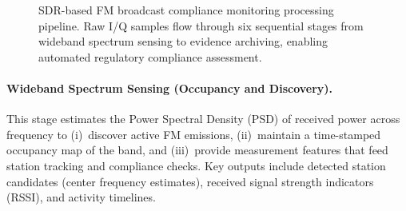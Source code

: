 \documentclass[11pt]{report}
\begin{document}
\begin{description}
\begin{figure}[!ht]
	\caption{SDR-based FM broadcast compliance monitoring processing pipeline. Raw I/Q samples flow through six sequential stages from wideband spectrum sensing to evidence archiving, enabling automated regulatory compliance assessment.}
	\label{fig:processing_pipeline}
\end{figure}

\end{description}
\paragraph*{Wideband Spectrum Sensing (Occupancy and Discovery).}
This stage estimates the Power Spectral Density (PSD) of received power across frequency to  (i)~discover active FM emissions, (ii)~maintain a time-stamped occupancy map  of the band, and (iii)~provide measurement features that feed station  tracking and compliance checks. Key outputs include detected station candidates (center frequency estimates), received signal strength indicators (RSSI), and activity timelines.
\end{document}

